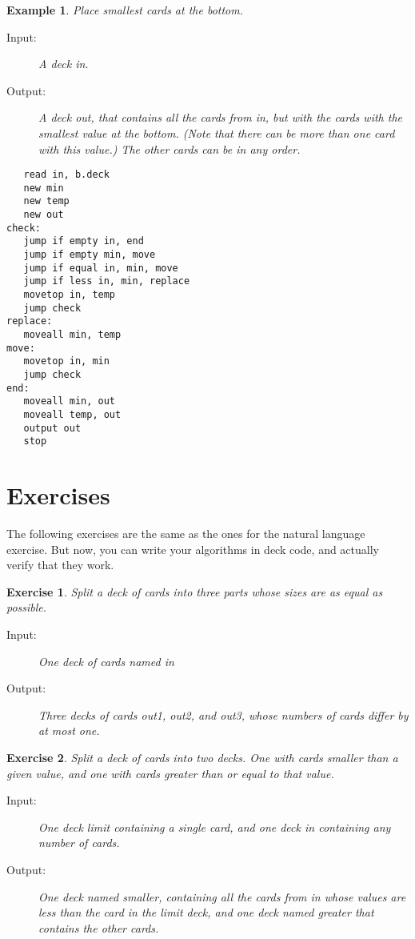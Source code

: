 \documentclass[a4paper,twoside]{tufte-handout}
\newtheorem{exercise}{Exercise}
\newtheorem{example}{Example}
\begin{document}
\begin{example}\label{smallbottom}
  Place smallest cards at the bottom.
  \begin{description}
  \item[Input:] A deck \emph{in}.
  \item[Output:] A deck \emph{out}, that contains all the cards from
    in, but with the cards with the smallest value at the
    bottom. (Note that there can be more than one card with this
    value.) The other cards can be in any order.
 \end{description}
\begin{lstlisting}
   read in, b.deck
   new min
   new temp
   new out
check:
   jump if empty in, end
   jump if empty min, move
   jump if equal in, min, move
   jump if less in, min, replace
   movetop in, temp
   jump check
replace:
   moveall min, temp
move:
   movetop in, min
   jump check
end:
   moveall min, out
   moveall temp, out
   output out
   stop
\end{lstlisting}
\end{example}

\section{Exercises}\label{sec-editrun}

The following exercises are the same as the ones for the natural
language exercise. But now, you can write your algorithms in deck
code, and actually verify that they work.

\begin{exercise}
  Split a deck of cards into three parts whose sizes are as equal as possible.
  \begin{description}
  \item[Input:] One deck of cards named \emph{in}
  \item[Output:] Three decks of cards \emph{out1}, \emph{out2}, and
    \emph{out3}, whose numbers of cards differ by at most one.
 \end{description}
\end{exercise}

\begin{exercise}
  Split a deck of cards into two decks. One with cards smaller than a
  given value, and one with cards greater than or equal to that value.
  \begin{description}
  \item[Input:] One deck \emph{limit} containing a single card, and one
    deck \emph{in} containing any number of cards.
  \item[Output:] One deck named \emph{smaller}, containing all the
    cards from \emph{in} whose values are less than the card in the
    \emph{limit} deck, and one deck named \emph{greater} that contains
    the other cards.
  \end{description}
\end{exercise}
\end{document}
